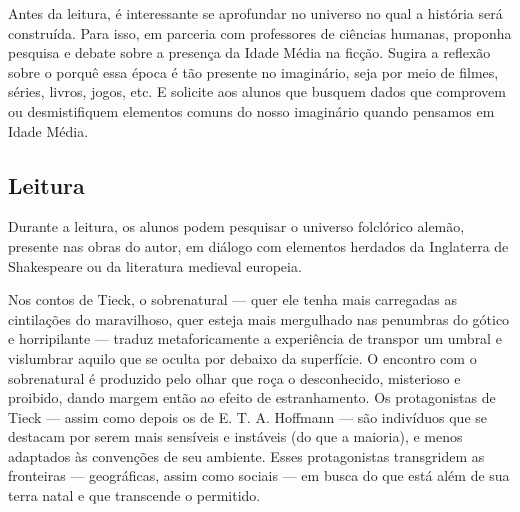 \documentclass[11pt]{extarticle}
\begin{document}
Antes da leitura, é interessante se aprofundar no universo
no qual a história será construída. Para isso, em parceria com
professores de ciências humanas, proponha pesquisa e debate sobre a
presença da Idade Média na ficção. Sugira a reflexão sobre o porquê essa
época é tão presente no imaginário, seja por meio de filmes, séries,
livros, jogos, etc. E solicite aos alunos que busquem dados que
comprovem ou desmistifiquem elementos comuns do nosso imaginário quando
pensamos em Idade Média.

\subsection{Leitura}


Durante a leitura, os alunos podem pesquisar o universo
folclórico alemão, presente nas obras do autor, em diálogo com elementos
herdados da Inglaterra de Shakespeare ou da literatura medieval
europeia.

Nos contos de Tieck, o sobrenatural --- quer ele tenha mais carregadas
as cintilações do maravilhoso, quer esteja mais mergulhado nas penumbras
do gótico e horripilante --- traduz metaforicamente a experiência de
transpor um umbral e vislumbrar aquilo que se oculta por debaixo da
superfície. O encontro com o sobrenatural é produzido pelo olhar que
roça o desconhecido, misterioso e proibido, dando margem então ao efeito
de estranhamento. Os protagonistas de Tieck --- assim como depois os de
E. T. A. Hoffmann --- são indivíduos que se destacam por serem mais
sensíveis e instáveis (do que a maioria), e menos adaptados às
convenções de seu ambiente. Esses protagonistas transgridem as
fronteiras --- geográficas, assim como sociais --- em busca do que está
além de sua terra natal e que transcende o permitido.
\end{document}
